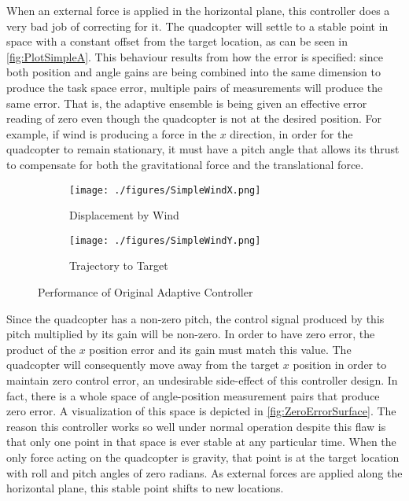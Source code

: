 \documentclass[letterpaper,12pt,titlepage,oneside,final]{book}
\begin{document}
When an external force is applied in the horizontal plane, this controller does a very bad job of correcting for it. 
The quadcopter will settle to a stable point in space with a constant offset from the target location, as can be seen in \autoref{fig:PlotSimpleA}. 
This behaviour results from how the error is specified:
since both position and angle gains are being combined into the same dimension to produce the task space error, multiple pairs of measurements will produce the same error. 
That is, the adaptive ensemble is being given an effective error reading of zero even though the quadcopter is not at the desired position. 
For example, if wind is producing a force in the $x$ direction, in order for the quadcopter to remain stationary, it must have a pitch angle that allows its thrust to compensate for both the gravitational force and the translational force.

\begin{figure}
\centering
\begin{subfigure}[t]{0.48\textwidth}
\texttt{[image: ./figures/SimpleWindX.png]} %
\caption{Displacement by Wind}
\label{fig:PlotSimpleA}
\end{subfigure}
\begin{subfigure}[t]{0.48\textwidth}
\texttt{[image: ./figures/SimpleWindY.png]}
\caption{Trajectory to Target}
\label{fig:PlotSimpleB}
\end{subfigure}
\caption{Performance of Original Adaptive Controller}
\label{fig:PlotSimple}
\end{figure}


Since the quadcopter has a non-zero pitch, the control signal produced by this pitch multiplied by its gain will be non-zero. 
In order to have zero error, the product of the $x$ position error and its gain must match this value. 
The quadcopter will consequently move away from the target $x$ position in order to maintain zero control error, an undesirable side-effect of this controller design. 
In fact, there is a whole space of angle-position measurement pairs that produce zero error.
A visualization of this space is depicted in \autoref{fig:ZeroErrorSurface}. 
The reason this controller works so well under normal operation despite this flaw is that only one point in that space is ever stable at any particular time. 
When the only force acting on the quadcopter is gravity, that point is at the target location with roll and pitch angles of zero radians. 
As external forces are applied along the horizontal plane, this stable point shifts to new locations.
\end{document}
